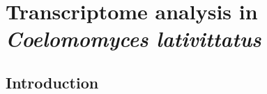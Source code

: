 ﻿%
\chapter{Transcriptome analysis in \textit{Coelomomyces lativittatus}}
\label{chap:Clat_transcriptome}
\section{Introduction}
